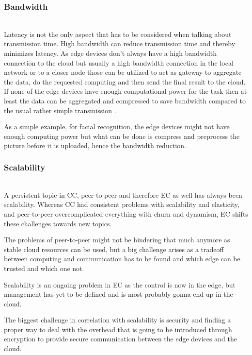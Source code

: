 \subsubsection{Bandwidth}\hspace*{\fill} \\
Latency is not the only aspect that has to be considered when talking about transmission time. High bandwidth can reduce transmission time and thereby minimizes latency.
As edge devices don’t always have a high bandwidth connection to the cloud but usually a high bandwidth connection in the local network or to a closer node those can be utilized to act as gateway to aggregate the data, do the requested computing and then send the final result to the cloud. If none of the edge devices have enough computational power for the task then at least the data can be aggregated and compressed to save bandwidth compared to the usual rather simple transmission \cite{7488250}.

As a simple example, for facial recognition, the edge devices might not have enough computing power but what can be done is compress and preprocess the picture before it is uploaded, hence the bandwidth reduction.

\subsubsection{Scalability}\hspace*{\fill} \\
A persistent topic in CC, peer-to-peer and therefore EC as well has always been scalability.
Whereas CC had consistent problems with scalability and elasticity, and peer-to-peer overcomplicated everything with churn and dynamism, EC shifts these challenges towards new topics.

The problems of peer-to-peer might not be hindering that much anymore as stable cloud resources can be used, but a big challenge arises as a tradeoff between computing and communication has to be found \cite{7488250}\cite{GarciaLopez:2015:ECV:2831347.2831354} and which edge can be trusted and which one not.

Scalability is an ongoing problem in EC as the control is now in the edge, but management has yet to be defined and is most probably gonna end up in the cloud.

The biggest challenge in correlation with scalability is security and finding a proper way to deal with the overhead that is going to be introduced through encryption to provide secure communication between the edge devices and the cloud.

